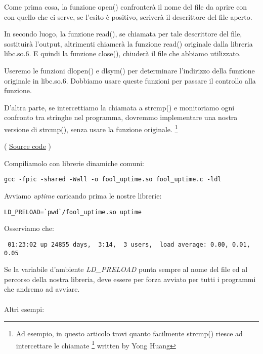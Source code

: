 Come prima cosa, la funzione open() confronterà il nome del file da aprire con con quello che ci serve,
se l'esito è positivo, scriverà il descrittore del file aperto.

In secondo luogo, la funzione read(), se chiamata per tale descrittore del file, sostituirà l'output, altrimenti chiamerà 
la funzione read() originale dalla libreria libc.so.6.
E quindi la funzione close(), chiuderà il file che abbiamo utilizzato.


Useremo le funzioni dlopen() e dlsym() per determinare l'indirizzo della funzione originale in libc.so.6.
Dobbiamo usare queste funzioni per passare il controllo alla  funzione.


D'altra parte, se intercettiamo la chiamata a strcmp() e monitoriamo ogni confronto tra stringhe
nel programma, dovremmo implementare una nostra versione di strcmp(), senza usare la funzione originale.
\footnote{Ad esempio, in questo articolo trovi quanto facilmente strcmp() riesce ad intercettare le chiamate
\footnote{\href{https://yurichev.com/mirrors/LD_PRELOAD/Yong%20Huang%20LD_PRELOAD.txt}{yurichev.com}}
written by Yong Huang}


( \href{\RepoURL/OS/LD_PRELOAD/fool_uptime.c}{Source code} )

Compiliamolo con librerie dinamiche comuni:

\begin{lstlisting}
gcc -fpic -shared -Wall -o fool_uptime.so fool_uptime.c -ldl
\end{lstlisting}

Avviamo \emph{uptime} caricando prima le nostre librerie:

\begin{lstlisting}
LD_PRELOAD=`pwd`/fool_uptime.so uptime
\end{lstlisting}

Osserviamo che:

\begin{lstlisting}
 01:23:02 up 24855 days,  3:14,  3 users,  load average: 0.00, 0.01, 0.05
\end{lstlisting}

Se la variabile d'ambiente \emph{LD\_PRELOAD} punta sempre al nome del file ed al percorso della nostra libreria, 
deve essere per forza avviato per tutti i programmi che andremo ad avviare. \\
\\
Altri esempi:

